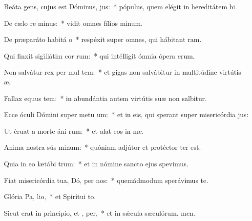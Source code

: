 \item Beáta gens, cujus est Dóminus,  jus:~* pópulus, quem elégit in hereditátem bi.
\item De cælo re minus:~* vidit omnes fílios minum.
\item De præparáto habitá o~* respéxit super omnes, qui hábitant ram.
\item Qui finxit sigillátim cor rum:~* qui intélligit ómnia ópera erum.
\item Non salvátur rex per mul tem:~* et gigas non salvábitur in multitúdine virtútis æ.
\item Fallax equus  tem:~* in abundántia autem virtútis suæ non salbitur.
\item Ecce óculi Dómini super metu um:~* et in eis, qui sperant super misericórdia jus:
\item Ut éruat a morte áni rum:~* et alat eos in me.
\item Anima nostra sús minum:~* quóniam adjútor et protéctor ter est.
\item Quia in eo lætábi  trum:~* et in nómine sancto ejus spevimus.
\item Fiat misericórdia tua, Dó, per nos:~* quemádmodum sperávimus  te.
\item Glória Pa,  lio,~* et Spirítui to.
\item Sicut erat in princípio, et ,  per,~* et in sǽcula sæculórum. men.
